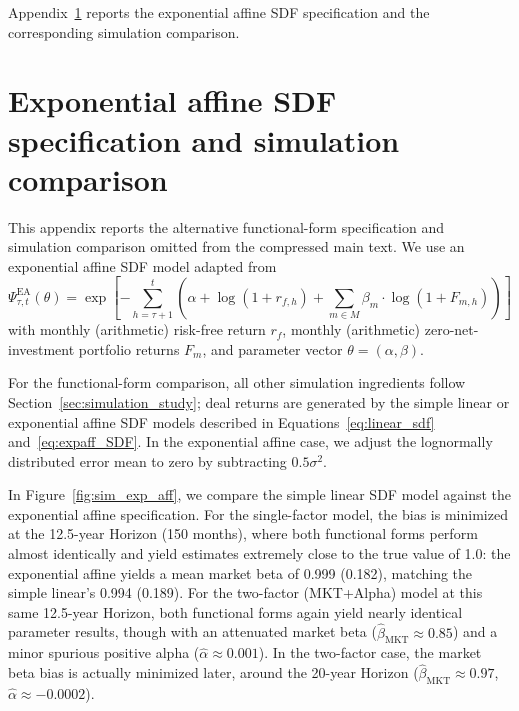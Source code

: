 Appendix~\ref{sec:appendix_exp_affine} reports the exponential affine SDF specification and the corresponding simulation comparison.




\section{Exponential affine SDF specification and simulation comparison}
\label{sec:appendix_exp_affine}

This appendix reports the alternative functional-form specification and simulation comparison omitted from the compressed main text.
We use an exponential affine SDF model adapted from \cite{KN16}
\begin{equation}
	\label{eq:expaff_SDF}
	\Psi_{\tau,t}^{\mathrm{EA}} (\theta) = 
	\exp
	\left[
	-\sum_{h=\tau+1}^{t} 
	\left(
	\alpha + \log (1 + r_{f,h}) + \sum_{m \in M} \beta_{m} \cdot \log (1 + F_{m,h})
	\right)
	\right]
\end{equation}
with monthly (arithmetic) risk-free return $r_f$, monthly (arithmetic) zero-net-investment portfolio returns $F_m$, and parameter vector $\theta=(\alpha,\beta)$.

For the functional-form comparison, all other simulation ingredients follow Section~\ref{sec:simulation_study}; deal returns are generated by the simple linear or exponential affine SDF models described in Equations~\eqref{eq:linear_sdf} and~\eqref{eq:expaff_SDF}.
In the exponential affine case, we adjust the lognormally distributed error mean to zero by subtracting $0.5 \sigma^2$.

In Figure~\ref{fig:sim_exp_aff}, we compare the simple linear SDF model against the exponential affine specification.
For the single-factor model, the bias is minimized at the 12.5-year Horizon (150 months), where both functional forms perform almost identically and yield estimates extremely close to the true value of 1.0: the exponential affine yields a mean market beta of 0.999 (0.182), matching the simple linear's 0.994 (0.189).
For the two-factor (MKT+Alpha) model at this same 12.5-year Horizon, both functional forms again yield nearly identical parameter results, though with an attenuated market beta ($\hat{\beta}_{\mathrm{MKT}} \approx 0.85$) and a minor spurious positive alpha ($\hat{\alpha} \approx 0.001$).
In the two-factor case, the market beta bias is actually minimized later, around the 20-year Horizon ($\hat{\beta}_{\mathrm{MKT}} \approx 0.97$, $\hat{\alpha} \approx -0.0002$).

